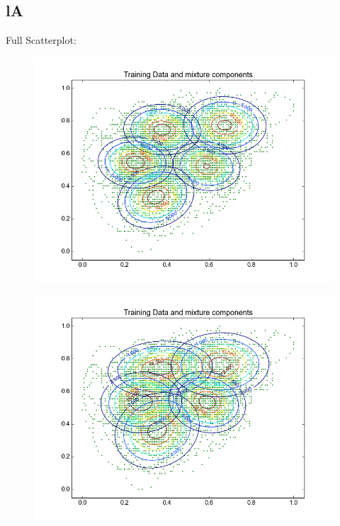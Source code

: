 \documentclass[11pt,a4paper]{article}
\begin{document}
\subsection{lA}
Full Scatterplot: \\
\begin{minipage}[b]{0.25\textwidth}
\begin{figure}[H]
  \centering
  \includegraphics[width=.8\linewidth]{Figures/contours_lA.test0.png}
  \label{fig:sfig1}
\end{figure}%
\end{minipage}
\begin{minipage}[b]{0.25\textwidth}
\begin{figure}[H]
  \centering
  \includegraphics[width=.8\linewidth]{Figures/contours_lA.test5.png}

  \label{fig:sfig1}
\end{figure}%
\end{minipage}
\end{document}
